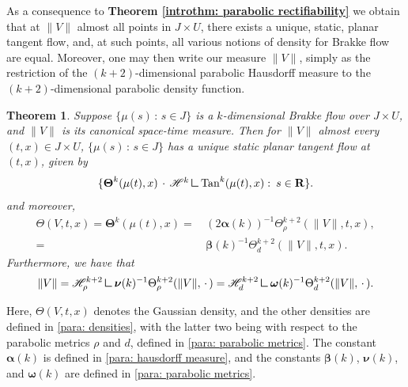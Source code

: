 \documentclass{article}
\theoremstyle{plain}
\theoremstyle{definition}
\theoremstyle{plain}
\theoremstyle{remark}
\theoremstyle{remark}
\theoremstyle{plain}
\newtheorem{introTheorem}{Theorem}
\newcommand{\weight}{\mathbin{\vrule height 1.6ex depth 0pt width
		0.14ex\vrule height 0.14ex depth 0pt width 1.3ex}}
\DeclareMathOperator{\Tan}{Tan}
\DeclareMathOperator*{\Density}{\boldsymbol{\rm \Theta}}
\begin{document}
As a consequence to \textbf{Theorem \ref{introthm: parabolic rectifiability}} we obtain that at $\| V \|$ almost all points in $J \times U$, there exists a unique, static, planar tangent flow, and, at such points, all various notions of density for Brakke flow are equal.
Moreover, one may then write our measure $\| V \|$, simply as the restriction of the $(k + 2)$-dimensional parabolic Hausdorff measure to the $(k + 2)$-dimensional parabolic density function.

\begin{introTheorem}\label{introthm: existence of static tangent flow and equality of densities}
    Suppose $\{ \mu (s) \, \colon \, s \in J \}$ is a $k$-dimensional Brakke flow over $J \times U$, and $\| V \|$ is its canonical space-time measure. 
    Then for $\|V\|$ almost every $(t,x)\in J\times U$, $\{ \mu (s) \, \colon \, s \in J \}$ has a unique static planar tangent flow at $(t, x)$, given by
        \begin{equation*}
                \textstyle \{ \Density^{k}(\mu (t), x) \, \cdot \, \mathscr{H}^{k} \weight \Tan^k(\mu (t),x) \, \colon \, s \in \mathbf{R} \}.
        \end{equation*} 
        and moreover, 
        \begin{align*}
            \Theta (V, t, x) = \mathbf{\Theta}^{k} (\mu (t), x) =& \, (2 \boldsymbol{\alpha} (k))^{-1} \Theta^{k + 2}_{\rho} (\| V \|, t, x), \\ 
            =& \, \boldsymbol{\beta} (k)^{-1} \Theta^{k + 2}_{d} (\| V \|, t, x).
        \end{align*}
        Furthermore, we have that 
        \begin{equation*}
        \| V \| = \mathscr{H}^{k + 2}_{\rho} \weight \boldsymbol{\nu} (k)^{-1} \Theta_{\rho}^{k + 2} (\| V \|, \, \cdot \, ) = \mathscr{H}^{k + 2}_{d} \weight \boldsymbol{\omega} (k)^{-1} \Theta_{d}^{k + 2} (\| V \|, \, \cdot \, ).
    \end{equation*}
\end{introTheorem}

Here, $\Theta (V, t ,x)$ denotes the Gaussian density, and the other densities are defined in \ref{para: densities}, with the latter two being with respect to the parabolic metrics $\rho$ and $d$, defined in \ref{para: parabolic metrics}.
The constant $\boldsymbol{\alpha} (k)$ is defined in \ref{para: hausdorff measure}, and the constants $\boldsymbol{\beta} (k)$, $\boldsymbol{\nu} (k)$, and $\boldsymbol{\omega} (k)$ are defined in \ref{para: parabolic metrics}. 
\end{document}
